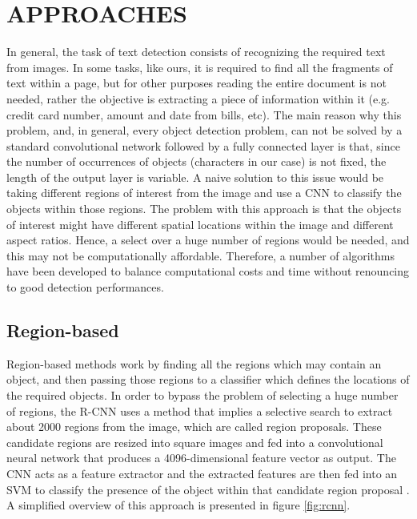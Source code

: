\section{APPROACHES}
\label{sec:approaches}

In general, the task of text detection consists of recognizing the required text from images. In some tasks, like ours, it is required to find all the fragments of text within a page, but for other purposes reading the entire document is not needed, rather the objective is extracting a piece of information within it (e.g. credit card number, amount and date from bills, etc). The main reason why this problem, and, in general, every object detection problem, can not be solved by a standard convolutional network followed by a fully connected layer is that, since the number of occurrences of objects (characters in our case) is not fixed, the length of the output layer is variable. A naive solution to this issue would be taking different regions of interest from the image and use a CNN to classify the objects within those regions. The problem with this approach is that the objects of interest might have different spatial locations within the image and different aspect ratios. Hence, a select over a huge number of regions would be needed, and this may not be computationally affordable. Therefore, a number of algorithms have been developed to balance computational costs and time without renouncing to good detection performances.

\subsection{Region-based}
\label{ssec:regionbased}

Region-based methods work by finding all the regions which may contain an object, and then passing those regions to a classifier which defines the locations of the required objects. In order to bypass the problem of selecting a huge number of regions, the R-CNN uses a method that implies a selective search to extract about 2000 regions from the image, which are called region proposals. These candidate regions are resized into square images and fed into a convolutional neural network that produces a 4096-dimensional feature vector as output. The CNN acts as a feature extractor and the extracted features are then fed into an SVM to classify the presence of the object within that candidate region proposal \cite{Gandhi2018}. A simplified overview of this approach is presented in figure \ref{fig:rcnn}.

